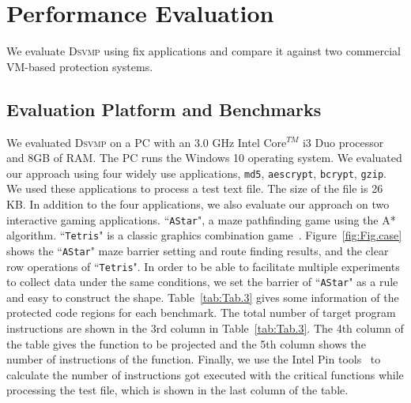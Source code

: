 \documentclass[preprint,12pt,3p]{elsarticle}
\newcommand{\DSVMP}{\textsc{Dsvmp}\xspace}
\begin{document}
\section{Performance Evaluation}\label{sec:p-eva}
We evaluate \DSVMP using fix  applications
and compare it against two commercial VM-based protection systems.

\subsection{Evaluation Platform and Benchmarks}
We evaluated \DSVMP on a PC with an 3.0 GHz Intel Core$^{TM}$ i3 Duo processor and 8GB of RAM.
The PC runs the Windows 10 operating system. We evaluated our approach using four widely use applications, \texttt{md5}, \texttt{aescrypt}, \texttt{bcrypt}, \texttt{gzip}.
We used these applications to process a test text file. The size of the file is 26 KB.
In addition to the four applications, we also evaluate our approach on two interactive gaming applications.
``\texttt{AStar}", a maze pathfinding game using the A* algorithm. ``\texttt{Tetris}" is a classic graphics combination game~\cite{benchmark}.
Figure~\ref{fig:Fig.case} shows the ``\texttt{AStar}" maze barrier setting and route finding results, and the clear row operations of ``\texttt{Tetris}".
In order to be able to facilitate multiple experiments to collect data under the same conditions, we set the barrier of ``\texttt{AStar}" as a rule and easy to construct the shape.
Table~\ref{tab:Tab.3} gives some information of the protected code regions for each benchmark.
The total number of target program instructions are shown in the 3rd column in Table~\ref{tab:Tab.3}.
The 4th column of the table gives the function to be projected
and the 5th column shows the number of instructions of the function.
Finally, we use the Intel Pin tools~\cite{pin} to calculate the number of instructions got executed with the critical functions
while processing the test file, which is shown in the last column of the table.
\end{document}

